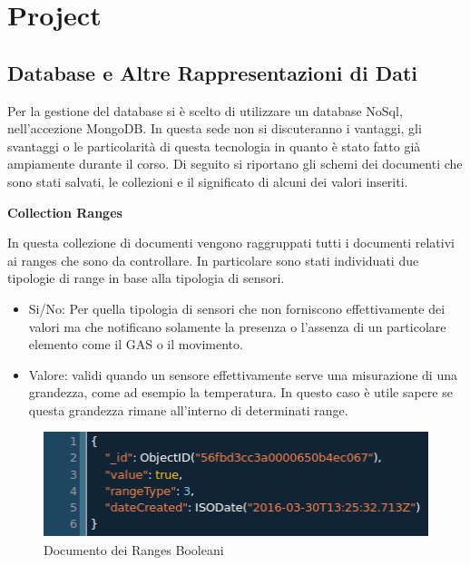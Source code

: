 \section{Project}
\subsection{Database e Altre Rappresentazioni di Dati}

Per la gestione del database si \`e scelto di utilizzare un database NoSql, nell'accezione MongoDB\cite{MongoDB}. In questa sede non si discuteranno i vantaggi, gli svantaggi o le particolarit\`a di questa tecnologia in quanto \`e stato fatto gi\`a ampiamente durante il corso. Di seguito si riportano gli schemi dei documenti che sono stati salvati, le collezioni e il significato di alcuni dei valori inseriti.

\begin{center}
\textbf{Collection Ranges}
\end{center}

In questa collezione di documenti vengono raggruppati tutti i documenti relativi ai ranges che sono da controllare. In particolare sono stati individuati due tipologie di range in base alla tipologia di sensori.

\begin{itemize}
  \item Si/No: Per quella tipologia di sensori che non forniscono effettivamente dei valori ma che notificano solamente la presenza o l'assenza di un particolare elemento come il GAS o il movimento.
  \item  Valore: validi quando un sensore effettivamente serve una misurazione di una grandezza, come ad esempio la temperatura. In questo caso \`e utile sapere se questa grandezza rimane all'interno di determinati range.
\end{itemize}

\begin{figure}[ht]
\centering
\includegraphics[width=\textwidth,natwidth=610,natheight=642]{Figures/DataStructures/RangesBoolean.png}
\caption{Documento dei Ranges Booleani}
\end{figure}

